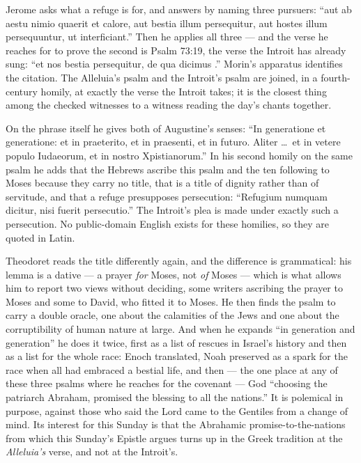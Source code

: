 \begin{witnessnote}
Jerome asks what a refuge is for, and answers by naming three pursuers: ``aut
ab aestu nimio quaerit et calore, aut bestia illum persequitur, aut hostes
illum persequuntur, ut interficiant.'' Then he applies all three --- and the
verse he reaches for to prove the second is Psalm 73:19, the verse the Introit
has already sung: ``et nos bestia persequitur, de qua dicimus .'' Morin's apparatus identifies the citation.
The Alleluia's psalm and the Introit's psalm are joined, in a fourth-century
homily, at exactly the verse the Introit takes; it is the closest thing among
the checked witnesses to a witness reading the day's chants together.

On the phrase itself he gives both of Augustine's senses: ``In generatione et
generatione: et in praeterito, et in praesenti, et in futuro. Aliter \dots\ et
in vetere populo Iudaeorum, et in nostro Xpistianorum.'' In his second homily
on the same psalm he adds that the Hebrews ascribe this psalm and the ten
following to Moses because they carry no title, that  is a
title of dignity rather than of servitude, and that a refuge presupposes
persecution: ``Refugium numquam dicitur, nisi fuerit persecutio.'' The
Introit's plea is made under exactly such a persecution. No
public-domain English exists for these homilies, so they are quoted in Latin.
\end{witnessnote}

Theodoret reads the title differently again, and the difference is
grammatical: his lemma is a dative --- a prayer \emph{for} Moses, not \emph{of}
Moses --- which is what allows him to report two views without deciding, some
writers ascribing the prayer to Moses and some to David, who fitted it to
Moses. He then finds the psalm to carry a double oracle, one about the
calamities of the Jews and one about the corruptibility of human nature at
large. And when he expands ``in generation and generation'' he does it twice,
first as a list of rescues in Israel's history and then as a list for the whole
race: Enoch translated, Noah preserved as a spark for the race when all had
embraced a bestial life, and then --- the one place at any of these three
psalms where he reaches for the covenant --- God ``choosing the patriarch
Abraham, promised the blessing to all the nations.'' It is polemical in
purpose, against those who said the Lord came to the Gentiles from a change of
mind. Its interest for this Sunday is that the Abrahamic promise-to-the-nations from which
this Sunday's Epistle argues turns up in the Greek tradition at the
\textit{Alleluia's} verse, and not at the Introit's.


